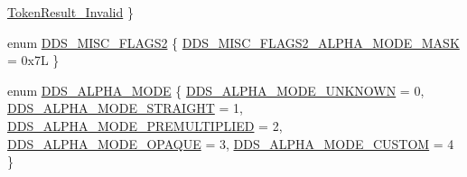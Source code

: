 \begin{DoxyCompactItemize}
\hyperlink{namespacemage_a2178ba2411db5912f41b2e7698c2037dae7f27c475d583cff0e4521723c9c7e4d}{Token\+Result\+\_\+\+Invalid}
 \}
\item 
enum \hyperlink{namespacemage_a0943eceedce2e66b3b66d0566b15c712}{D\+D\+S\+\_\+\+M\+I\+S\+C\+\_\+\+F\+L\+A\+G\+S2} \{ \hyperlink{namespacemage_a0943eceedce2e66b3b66d0566b15c712af6954b93e1e18fa5366ebb55d65ecbcf}{D\+D\+S\+\_\+\+M\+I\+S\+C\+\_\+\+F\+L\+A\+G\+S2\+\_\+\+A\+L\+P\+H\+A\+\_\+\+M\+O\+D\+E\+\_\+\+M\+A\+SK} = 0x7L
 \}
\item 
enum \hyperlink{namespacemage_a0c586a2bad862f4858900ca121ca80c2}{D\+D\+S\+\_\+\+A\+L\+P\+H\+A\+\_\+\+M\+O\+DE} \{ \newline
\hyperlink{namespacemage_a0c586a2bad862f4858900ca121ca80c2ae15c70e072553fb579ef26eedb737768}{D\+D\+S\+\_\+\+A\+L\+P\+H\+A\+\_\+\+M\+O\+D\+E\+\_\+\+U\+N\+K\+N\+O\+WN} = 0, 
\hyperlink{namespacemage_a0c586a2bad862f4858900ca121ca80c2a2cfa12c9a40e943b5e51043c45db5f95}{D\+D\+S\+\_\+\+A\+L\+P\+H\+A\+\_\+\+M\+O\+D\+E\+\_\+\+S\+T\+R\+A\+I\+G\+HT} = 1, 
\hyperlink{namespacemage_a0c586a2bad862f4858900ca121ca80c2a6dfa3f7a9c0031bc87cc35d8365e3b74}{D\+D\+S\+\_\+\+A\+L\+P\+H\+A\+\_\+\+M\+O\+D\+E\+\_\+\+P\+R\+E\+M\+U\+L\+T\+I\+P\+L\+I\+ED} = 2, 
\hyperlink{namespacemage_a0c586a2bad862f4858900ca121ca80c2a0f5075a259bfecc6fb934b92bcc6dd1d}{D\+D\+S\+\_\+\+A\+L\+P\+H\+A\+\_\+\+M\+O\+D\+E\+\_\+\+O\+P\+A\+Q\+UE} = 3, 
\newline
\hyperlink{namespacemage_a0c586a2bad862f4858900ca121ca80c2a145fc5c46af6e8635680d59f55ce956f}{D\+D\+S\+\_\+\+A\+L\+P\+H\+A\+\_\+\+M\+O\+D\+E\+\_\+\+C\+U\+S\+T\+OM} = 4
 \}
\end{DoxyCompactItemize}
